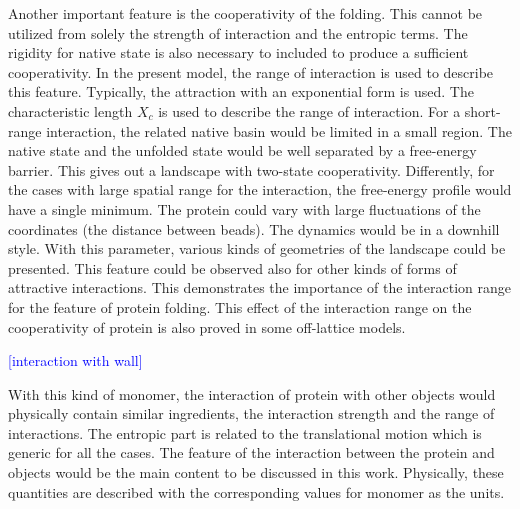 \documentclass[preprint,preprintnumbers,amsmath,amssymb,showpacs,aps,pre]{revtex4-1}
\begin{document}
Another important feature is the cooperativity of the folding. This cannot
be utilized from solely the strength of interaction and the entropic terms.
The rigidity for native state is also necessary to included to produce a
sufficient cooperativity. In the present model, the range of interaction is
used to describe this feature. Typically, the attraction with an exponential
form is used. The characteristic length $X_c$ is used to describe the range
of interaction. For a short-range interaction, the related
native basin would be limited in a small region. The native state and the
unfolded state would be well separated by a free-energy barrier. This gives
out a landscape with two-state cooperativity. Differently, for the cases with
large spatial range for the interaction, the free-energy profile would have a
single minimum. The protein could vary with large fluctuations of the
coordinates (the distance between beads). The dynamics would be in a downhill
style. With this parameter, various kinds of geometries of the landscape could
be presented. This feature could be observed also for other kinds of forms of
attractive interactions. This demonstrates the importance of the interaction
range for the feature of protein folding.  This effect of the interaction range
on the cooperativity of protein is also proved in some off-lattice models.

\textcolor{blue}{[interaction with wall]}

With this kind of monomer, the interaction of protein with other objects
would physically contain similar ingredients, the interaction strength and the
range of interactions. The entropic part is related to the translational
motion which is generic for all the cases. The feature of the interaction
between the protein and objects would be the main content to be discussed in
this work. Physically, these quantities are described with 
the corresponding values for monomer as the units.
\end{document}
